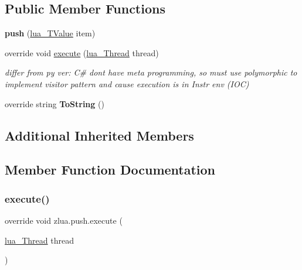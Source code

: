 \subsection*{Public Member Functions}
\begin{DoxyCompactItemize}
\item 
\mbox{\label{classzlua_1_1push_a5b00663f4af8797023a2f9b3ad4341a2}} 
{\bfseries push} (\mbox{\hyperlink{classzlua_1_1lua___t_value}{lua\+\_\+\+T\+Value}} item)
\item 
override void \mbox{\hyperlink{classzlua_1_1push_ab3284599ae65d600d21622bd407405e8}{execute}} (\mbox{\hyperlink{classzlua_1_1lua___thread}{lua\+\_\+\+Thread}} thread)
\begin{DoxyCompactList}\small\item\em differ from py ver\+: C\# dont have meta programming, so must use polymorphic to implement visitor pattern and cause execution is in Instr env (I\+OC) \end{DoxyCompactList}\item 
\mbox{\label{classzlua_1_1push_ab785fcb2a7de273f23f66a2ed04d4fff}} 
override string {\bfseries To\+String} ()
\end{DoxyCompactItemize}
\subsection*{Additional Inherited Members}


\subsection{Member Function Documentation}
\mbox{\label{classzlua_1_1push_ab3284599ae65d600d21622bd407405e8}} 
\subsubsection{\texorpdfstring{execute()}{execute()}}
{\footnotesize\ttfamily override void zlua.\+push.\+execute (\begin{DoxyParamCaption}\item[{\mbox{\hyperlink{classzlua_1_1lua___thread}{lua\+\_\+\+Thread}}}]{thread }\end{DoxyParamCaption})\hspace{0.3cm}{\ttfamily [virtual]}}



